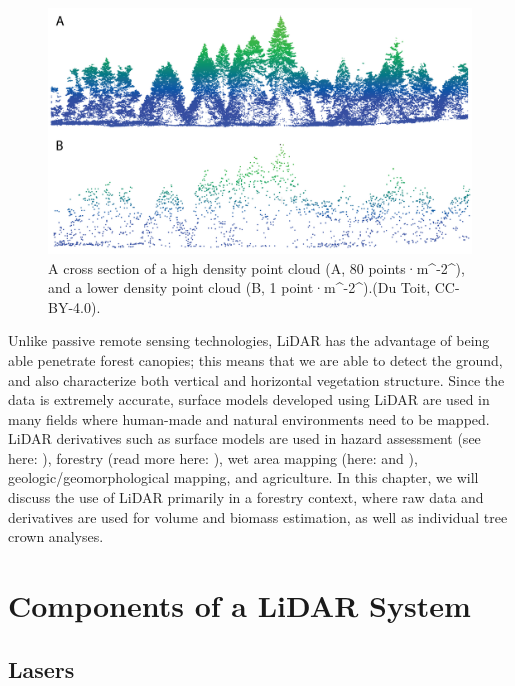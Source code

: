 \documentclass[
]{book}
\begin{document}
\begin{figure}
\includegraphics[width=0.8\linewidth]{images/15-high-low-point-density} \caption{A cross section of a high density point cloud (A, 80 points·m^-2^), and a lower density point cloud (B, 1 point·m^-2^).(Du Toit, CC-BY-4.0).}\label{fig:15-high-low-point-density}
\end{figure}

Unlike passive remote sensing technologies, LiDAR has the advantage of being able penetrate forest canopies; this means that we are able to detect the ground, and also characterize both vertical and horizontal vegetation structure. Since the data is extremely accurate, surface models developed using LiDAR are used in many fields where human-made and natural environments need to be mapped. LiDAR derivatives such as surface models are used in hazard assessment (see here: \citet{jaboyedoff_use_2012}), forestry (read more here: \citet{goodbody_airborne_2021}), wet area mapping (here: \citet{eash_stream-channel_2018} and \citet{zurqani_evaluating_2020}), geologic/geomorphological mapping, and agriculture. In this chapter, we will discuss the use of LiDAR primarily in a forestry context, where raw data and derivatives are used for volume and biomass estimation, as well as individual tree crown analyses.

\hypertarget{components-of-a-lidar-system}{%
\section{Components of a LiDAR System}\label{components-of-a-lidar-system}}

\hypertarget{lasers}{%
\subsection{Lasers}\label{lasers}}
\end{document}
